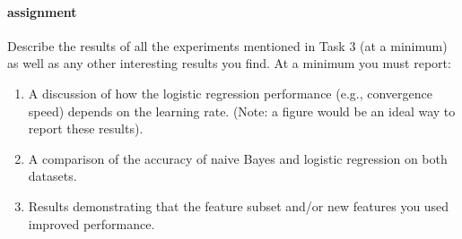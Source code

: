 \documentclass{article}
\begin{document}
\paragraph{assignment} Describe the results of all the experiments mentioned in Task 3 (at a minimum) as well as any other interesting results you find. At a minimum you must report:

\begin{enumerate}
    \item A discussion of how the logistic regression performance (e.g., convergence speed) depends on the learning rate. (Note: a figure would be an ideal way to report these results).
    \item A comparison of the accuracy of naive Bayes and logistic regression on both datasets.
    \item Results demonstrating that the feature subset and/or new features you used improved performance.
\end{enumerate}
\end{document}
